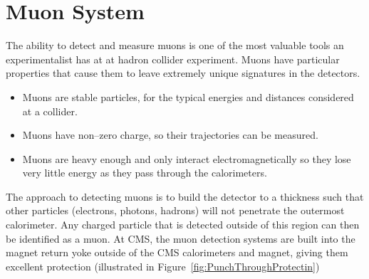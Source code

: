\section{Muon System}
The ability to detect and measure muons is one of the most valuable tools an
experimentalist has at at hadron collider experiment.  Muons have particular
properties that cause them to leave extremely unique signatures in the detectors.
\begin{itemize}
  \item Muons are stable particles, for the typical energies and distances
    considered at a collider.
  \item Muons have non--zero charge, so their trajectories can be measured.
  \item Muons are heavy enough and only interact electromagnetically so 
    they lose very little energy as they pass through the calorimeters.
\end{itemize}
The approach to detecting muons is to build the detector to a thickness such
that other particles (electrons, photons, hadrons) will not penetrate the
outermost calorimeter.  Any charged particle that is detected outside of this
region can then be identified as a muon.  At CMS, the muon detection systems are
built into the magnet return yoke outside of the CMS calorimeters and magnet,
giving them excellent protection (illustrated in
Figure~\ref{fig:PunchThroughProtectin}) 
